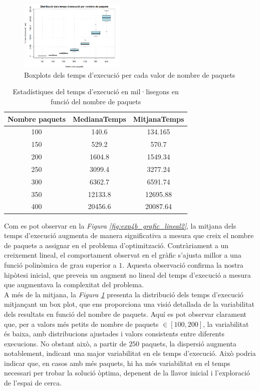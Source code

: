 \documentclass[a4paper]{article}
\begin{document}
	\begin{figure}[H]
		\centering
		\includegraphics[width=0.45\textwidth]{images/exp4b_boxplots.png}
		\caption{Boxplots dels temps d'execució per cada valor de nombre de paquets}
		\label{fig:exp4b_boxplots}
	\end{figure}
	
	\begin{table}[H]
		\centering
		\begin{tabular}{|c|c|c|}
			\hline
			\textbf{Nombre paquets} & \textbf{MedianaTemps} & \textbf{MitjanaTemps} \\
			\hline
			100 & 140.6 & 134.165\\
			\hline
			150& 529.2 & 570.7\\
			\hline
			200& 1604.8 & 1549.34\\
			\hline
			250& 3099.4 & 3277.24\\
			\hline
			300& 6362.7 & 6591.74\\
			\hline
			350& 12133.8 & 12695.88\\
			\hline
			400& 20456.6 & 20087.64\\
			\hline
		\end{tabular}
		\caption{Estadístiques del temps d'execució en mil·lisegons en funció del nombre de paquets}
		\label{tab:exp4b_temps}
	\end{table}
	
	Com es pot observar en la \textit{Figura \ref{fig:exp4b_grafic_lineal2}}, la mitjana dels temps d'execució augmenta de manera significativa a mesura que creix el nombre de paquets a assignar en el problema d'optimització. Contràriament a un creixement lineal, el comportament observat en el gràfic s'ajusta millor a una funció polinòmica de grau superior a $1$. Aquesta observació confirma la nostra hipòtesi inicial, que preveia un augment no lineal del temps d'execució a mesura que augmentava la complexitat del problema. \\
	
	A més de la mitjana, la \textit{Figura \ref{fig:exp4b_boxplots}} presenta la distribució dels temps d'execució mitjançant un box plot, que ens proporciona una visió detallada de la variabilitat dels resultats en funció del nombre de paquets. Aquí es pot observar clarament que, per a valors més petits de nombre de paquets $\in [100, 200]$, la variabilitat és baixa, amb distribucions ajustades i valors consistents entre diferents execucions. No obstant això, a partir de $250$ paquets, la dispersió augmenta notablement, indicant una major variabilitat en els temps d'execució. Això podria indicar que, en casos amb més paquets, hi ha més variabilitat en el temps necessari per trobar la solució òptima, depenent de la llavor inicial i l'exploració de l'espai de cerca. \\
	
\end{document}
